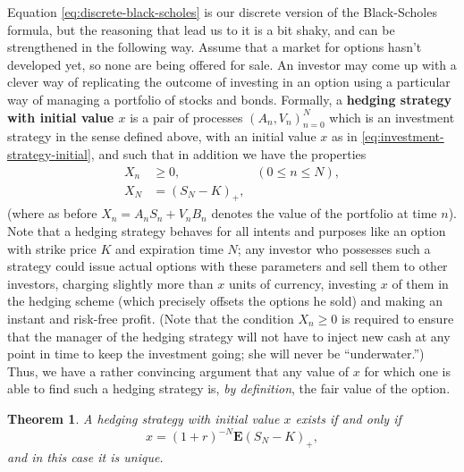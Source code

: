 \documentclass[12pt]{article}
\newtheorem{thm}{Theorem}[section]
\newcommand{\expec}{\mathbf{E}}
\theoremstyle{example}
\begin{document}
Equation \eqref{eq:discrete-black-scholes} is our discrete version of the Black-Scholes formula, but the reasoning that lead us to it is a bit shaky, and can be strengthened in the following way. Assume that a market for options hasn't developed yet, so none are being offered for sale. An investor may come up with a clever way of replicating the outcome of investing in an option using a particular way of managing a portfolio of stocks and bonds. Formally, a \textbf{hedging strategy with initial value $x$} is a pair of processes $(A_n,V_n)_{n=0}^N$ which is an investment strategy in the sense defined above, with an initial value $x$ as in \eqref{eq:investment-strategy-initial}, and such that in addition we have the properties
\begin{align*}
X_n &\ge 0,  \qquad \qquad \qquad (0\le n\le N), \\
X_N &= (S_N-K)_+,
\end{align*}
(where as before $X_n = A_n S_n + V_n B_n$ denotes the value of the portfolio at time $n$). Note that a hedging strategy behaves for all intents and purposes like an option with strike price $K$ and expiration time $N$; any investor who possesses such a strategy could issue actual options with these parameters and sell them to other investors, charging slightly more than $x$ units of currency, investing $x$ of them in the hedging scheme (which precisely offsets the options he sold) and making an instant and risk-free profit. (Note that the condition $X_n\ge0$ is required to ensure that the manager of the hedging strategy will not have to inject new cash at any point in time to keep the investment going; she will never be ``underwater.'')
Thus, we have a rather convincing argument that any value of $x$ for which one is able to find such a hedging strategy is, \emph{by definition}, the fair value of the option.

\begin{thm}
A hedging strategy with initial value $x$ exists if and only if 
\begin{equation} \label{eq:hedging-strategy-condition}
x=(1+r)^{-N}\expec(S_N-K)_+,
\end{equation}
and in this case it is unique.
\end{thm}
\end{document}
